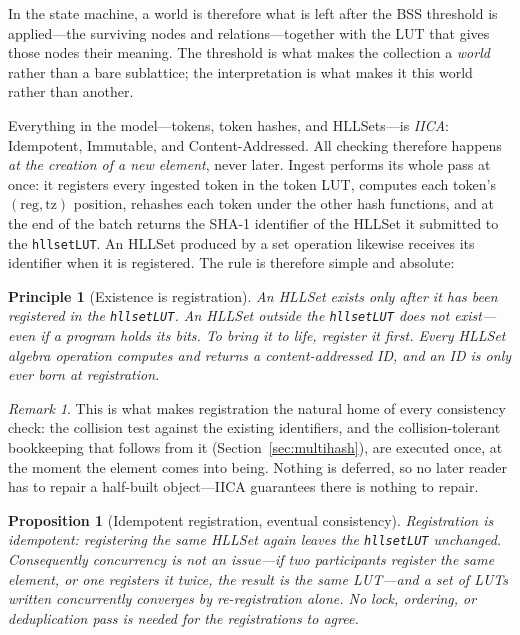 \documentclass[11pt,a4paper]{article}
\newtheorem{principle}{Principle}[section]
\newtheorem{proposition}[theorem]{Proposition}
\theoremstyle{remark}
\newtheorem{remark}[theorem]{Remark}
\begin{document}
In the state machine, a world is therefore what is left after the BSS threshold
is applied---the surviving nodes and relations---together with the LUT that
gives those nodes their meaning. The threshold is what makes the collection a
\emph{world} rather than a bare sublattice; the interpretation is what makes it
this world rather than another.

Everything in the model---tokens, token hashes, and HLLSets---is \emph{IICA}:
Idempotent, Immutable, and Content-Addressed. All checking therefore happens
\emph{at the creation of a new element}, never later. Ingest performs its whole
pass at once: it registers every ingested token in the token LUT, computes each
token's $(\mathrm{reg},\mathrm{tz})$ position, rehashes each token under the
other hash functions, and at the end of the batch returns the SHA-1 identifier
of the HLLSet it submitted to the \texttt{hllsetLUT}. An HLLSet produced by a
set operation likewise receives its identifier when it is registered. The rule
is therefore simple and absolute:

\begin{principle}[Existence is registration]
\label{prin:registration}
An HLLSet exists only after it has been registered in the \texttt{hllsetLUT}.
An HLLSet outside the \texttt{hllsetLUT} does not exist---even if a program
holds its bits. To bring it to life, register it first. Every HLLSet algebra
operation computes and returns a content-addressed ID, and an ID is only ever
born at registration.
\end{principle}

\begin{remark}
This is what makes registration the natural home of every consistency check:
the collision test against the existing identifiers, and the collision-tolerant
bookkeeping that follows from it (Section~\ref{sec:multihash}), are executed
once, at the moment the element comes into being. Nothing is deferred, so no
later reader has to repair a half-built object---IICA guarantees there is
nothing to repair.
\end{remark}

\begin{proposition}[Idempotent registration, eventual consistency]
\label{prop:registration-idempotent}
Registration is idempotent: registering the same HLLSet again leaves the
\texttt{hllsetLUT} unchanged. Consequently concurrency is not an issue---if two
participants register the same element, or one registers it twice, the result is
the same LUT---and a set of LUTs written concurrently converges by
\emph{re-registration} alone. No lock, ordering, or deduplication pass is
needed for the registrations to agree.
\end{proposition}
\end{document}
